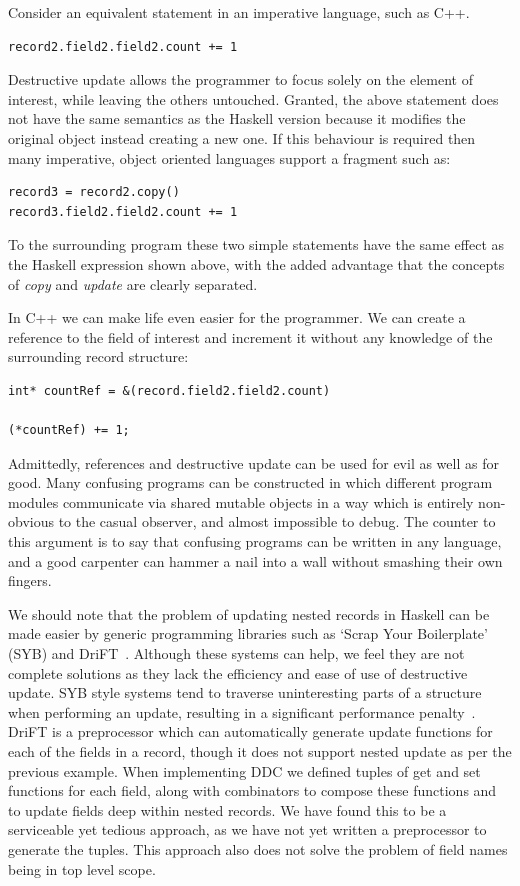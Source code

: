 Consider an equivalent statement in an imperative language, such as C++.
\begin{lstlisting}
record2.field2.field2.count += 1
\end{lstlisting}
Destructive update allows the programmer to focus solely on the element of interest, while leaving the others untouched. Granted, the above statement does not have the same semantics as the Haskell version because it modifies the original object instead creating a new one. If this behaviour is required then many imperative, object oriented languages support a fragment such as:
\begin{lstlisting}
record3 = record2.copy()
record3.field2.field2.count += 1
\end{lstlisting}
To the surrounding program these two simple statements have the same effect as the Haskell expression shown above, with the added advantage that the concepts of \emph{copy} and \emph{update} are clearly separated.

In C++ we can make life even easier for the programmer. We can create a reference to the field of interest and increment it without any knowledge of the surrounding record structure:
\begin{lstlisting}
int* countRef = &(record.field2.field2.count)

(*countRef) += 1;
\end{lstlisting}

Admittedly, references and destructive update can be used for evil as well as for good. Many confusing programs can be constructed in which different program modules communicate via shared mutable objects in a way which is entirely non-obvious to the casual observer, and almost impossible to debug. The counter to this argument is to say that confusing programs can be written in any language, and a good carpenter can hammer a nail into a wall without smashing their own fingers.

We should note that the problem of updating nested records in Haskell can be made easier by generic programming libraries such as `Scrap Your Boilerplate'~\cite{lammel:scrap-your-boilerplate} (SYB) and DriFT~\cite{hinze:generic-programming-in-haskell}. Although these systems can help, we feel they are not complete solutions as they lack the efficiency and ease of use of destructive update. SYB style systems tend to traverse uninteresting parts of a structure when performing an update, resulting in a significant performance penalty~\cite{mitchell:neil}. DriFT is a preprocessor which can automatically generate update functions for each of the fields in a record, though it does not support nested update as per the previous example. When implementing DDC we defined tuples of get and set functions for each field, along with combinators to compose these functions and to update fields deep within nested records. We have found this to be a serviceable yet tedious approach, as we have not yet written a preprocessor to generate the tuples. This approach also does not solve the problem of field names being in top level scope.

